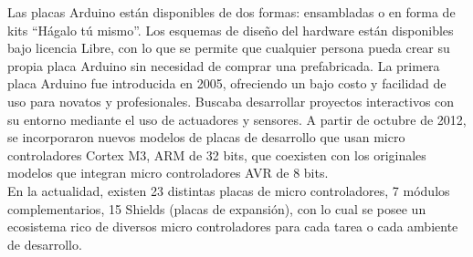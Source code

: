 Las placas Arduino están disponibles de dos formas: ensambladas o en forma de kits ``Hágalo tú mismo''. Los esquemas de diseño del hardware están disponibles bajo licencia Libre, con lo que se permite que cualquier persona pueda crear su propia placa Arduino sin necesidad de comprar una prefabricada. La primera placa Arduino fue introducida en 2005, ofreciendo un bajo costo y facilidad de uso para novatos y profesionales. Buscaba desarrollar proyectos interactivos con su entorno mediante el uso de actuadores y sensores. A partir de octubre de 2012, se incorporaron nuevos modelos de placas de desarrollo que usan micro controladores Cortex M3, ARM de 32 bits, que coexisten con los originales modelos que integran micro controladores AVR de 8 bits.\\

En la actualidad, existen 23 distintas placas de micro controladores, 7 módulos complementarios, 15 Shields (placas de expansión), con lo cual se posee un ecosistema rico de diversos micro controladores para cada tarea o cada ambiente de desarrollo. 

